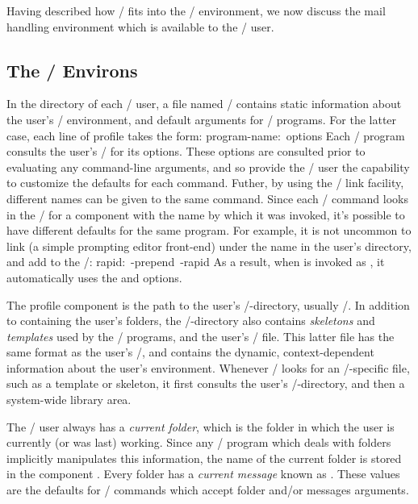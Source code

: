 Having described how \MH/ fits into the \unix/ environment,
we now discuss the mail handling environment which is available to the \MH/
user.

\subsection{The \MH/ Environs}			%
In the  directory of each \MH/ user, a file named
\profile/ contains static information about the user's \MH/ environment, 
and default arguments for \MH/ programs.
For the latter case,
each line of profile takes the form:
\example program-name:\ options\endexample
Each \MH/ program consults the user's \profile/ for its options.
These options are consulted prior to evaluating any command-line arguments,
and so provide the \MH/ user the capability to customize the defaults for each
command.
Futher, by using the \unix/ link facility,
different names can be given to the same command.
Since each \MH/ command looks
in the \profile/
for a component with the name by which it was invoked,
it's possible to have different defaults for the same program.
For example,
it is not uncommon to link 
(a simple prompting editor front-end)
under the name  in the
user's  directory, and add to the \profile/:
\example rapid:\ -prepend\ -rapid\endexample
As a result,
when  is invoked as ,
it automatically uses the  and  options.

The profile component  is the path to the user's
\MH/-directory, usually \Mail/.
In addition to containing the user's folders,
the \MH/-directory also contains {\it skeletons} and
{\it templates} used by the \MH/ programs,
and the user's \context/ file.
This latter file has the same format as the user's \profile/,
and contains the dynamic,
context-dependent information about the user's environment.
Whenever \MH/ looks for an \MH/-specific file,
such as a template or skeleton,
it first consults the user's \MH/-directory,
and then a system-wide library area.

The \MH/ user always has a {\it current folder},
which is the folder in which
the user is currently (or was last) working.
Since any \MH/ program which deals with folders implicitly manipulates this
information,
the name of the  current folder is stored in the 
component .
Every folder has a {\it current message} known as .
These values are the defaults for \MH/ commands which
accept folder and/or messages arguments.

